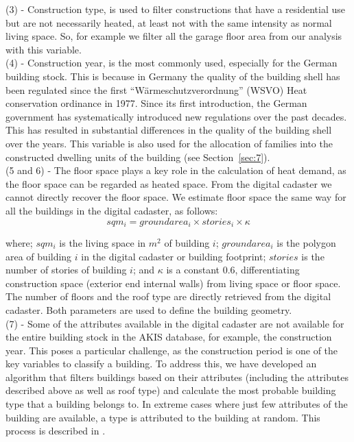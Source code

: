 \documentclass[11pt]{IJM-article}
\begin{document}
(3) - Construction type, is used to filter constructions that have a
residential use but are not necessarily heated, at least not with the same
intensity as normal living space. So, for example we filter all the garage
floor area from our analysis with this variable.\\

(4) - Construction year, is the most commonly used, especially for the German
building stock.  This is because in Germany the quality of the building shell
has been regulated since the first ``Wärmeschutzverordnung'' (WSVO) Heat
conservation ordinance in 1977. Since its first introduction, the German
government has systematically introduced new regulations over the past decades.
This has resulted in substantial differences in the quality of the building
shell over the years. This variable is also used for the allocation of families
into the constructed dwelling units of the building (see
Section~\ref{sec:7}).\\

(5 and 6) - The floor space plays a key role in the calculation of heat demand,
as the floor space can be regarded as heated space. From the digital cadaster
we cannot directly recover the floor space. We estimate floor space the same
way for all the buildings in the digital cadaster, as follows:\\

\begin{equation} 
    \label{eq:3} 
    sqm_i = groundarea_i \times stories_i \times \kappa 
\end{equation}\pb

where; $sqm_i$ is the living space in $m^2$ of building $i$; $groundarea_i$ is
the polygon area of building $i$ in the digital cadaster or building footprint;
$stories$ is the number of stories of building $i$; and $\kappa$ is a constant
0.6, differentiating construction space (exterior end internal walls) from
living space or floor space. The number of floors and the roof type are
directly retrieved from the digital cadaster. Both parameters are used to
define the building geometry. \\

(7) - Some of the attributes available in the digital cadaster are not
available for the entire building stock in the AKIS database, for example, the
construction year. This poses a particular challenge, as the construction
period is one of the key variables to classify a building. To address this, we
have developed an algorithm that filters buildings based on their attributes
(including the attributes described above as well as roof type) and calculate
the most probable building type that a building belongs to. In extreme cases
where just few attributes of the building are available, a type is attributed
to the building at random. This process is described in .\\
\end{document}
